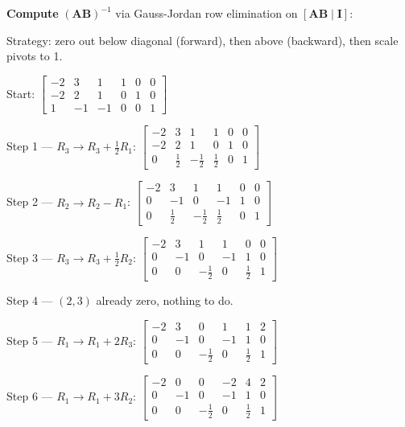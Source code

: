 \documentclass{article}
\begin{document}
\begin{aprob}
    \medskip
    \textbf{Compute} $(\mathbf{AB})^{-1}$ via Gauss-Jordan row elimination on $[\mathbf{AB} \mid \mathbf{I}]$:

    Strategy: zero out below diagonal (forward), then above (backward), then scale pivots to 1.

    \medskip
    Start:
    $\left[\begin{array}{ccc|ccc} -2 & 3 & 1 & 1 & 0 & 0 \\ -2 & 2 & 1 & 0 & 1 & 0 \\ 1 & -1 & -1 & 0 & 0 & 1 \end{array}\right]$

    \medskip
    Step 1 --- $R_3 \to R_3 + \frac{1}{2}R_1$:
    $\left[\begin{array}{ccc|ccc} -2 & 3 & 1 & 1 & 0 & 0 \\ -2 & 2 & 1 & 0 & 1 & 0 \\ 0 & \frac{1}{2} & -\frac{1}{2} & \frac{1}{2} & 0 & 1 \end{array}\right]$

    \medskip
    Step 2 --- $R_2 \to R_2 - R_1$:
    $\left[\begin{array}{ccc|ccc} -2 & 3 & 1 & 1 & 0 & 0 \\ 0 & -1 & 0 & -1 & 1 & 0 \\ 0 & \frac{1}{2} & -\frac{1}{2} & \frac{1}{2} & 0 & 1 \end{array}\right]$

    \medskip
    Step 3 --- $R_3 \to R_3 + \frac{1}{2}R_2$:
    $\left[\begin{array}{ccc|ccc} -2 & 3 & 1 & 1 & 0 & 0 \\ 0 & -1 & 0 & -1 & 1 & 0 \\ 0 & 0 & -\frac{1}{2} & 0 & \frac{1}{2} & 1 \end{array}\right]$

    \medskip
    Step 4 --- $(2,3)$ already zero, nothing to do.

    \medskip
    Step 5 --- $R_1 \to R_1 + 2R_3$:
    $\left[\begin{array}{ccc|ccc} -2 & 3 & 0 & 1 & 1 & 2 \\ 0 & -1 & 0 & -1 & 1 & 0 \\ 0 & 0 & -\frac{1}{2} & 0 & \frac{1}{2} & 1 \end{array}\right]$

    \medskip
    Step 6 --- $R_1 \to R_1 + 3R_2$:
    $\left[\begin{array}{ccc|ccc} -2 & 0 & 0 & -2 & 4 & 2 \\ 0 & -1 & 0 & -1 & 1 & 0 \\ 0 & 0 & -\frac{1}{2} & 0 & \frac{1}{2} & 1 \end{array}\right]$


\end{aprob}
\end{document}
